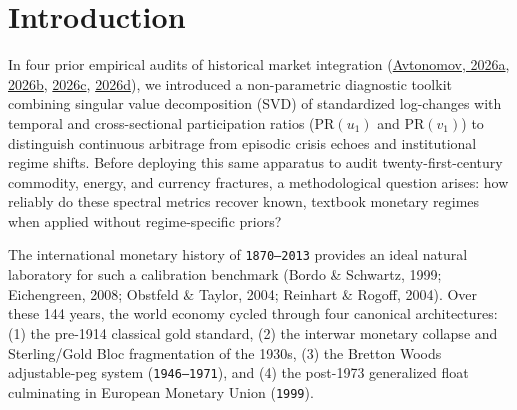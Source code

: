 \documentclass[11pt,a4paper]{article}
\begin{document}
\section{Introduction}

In four prior empirical audits of historical market integration (\href{https://doi.org}{Avtonomov, 2026a}, \href{https://doi.org}{2026b}, \href{https://doi.org}{2026c}, \href{https://doi.org}{2026d}), we introduced a non-parametric diagnostic toolkit combining singular value decomposition (SVD) of standardized log-changes with temporal and cross-sectional participation ratios ($\mathrm{PR}(u_1)$ and $\mathrm{PR}(v_1)$) to distinguish continuous arbitrage from episodic crisis echoes and institutional regime shifts. Before deploying this same apparatus to audit twenty-first-century commodity, energy, and currency fractures, a methodological question arises: how reliably do these spectral metrics recover known, textbook monetary regimes when applied without regime-specific priors?

The international monetary history of \texttt{1870--2013} provides an ideal natural laboratory for such a calibration benchmark (Bordo \& Schwartz, 1999; Eichengreen, 2008; Obstfeld \& Taylor, 2004; Reinhart \& Rogoff, 2004). Over these 144 years, the world economy cycled through four canonical architectures: (1) the pre-1914 classical gold standard, (2) the interwar monetary collapse and Sterling/Gold Bloc fragmentation of the 1930s, (3) the Bretton Woods adjustable-peg system (\texttt{1946--1971}), and (4) the post-1973 generalized float culminating in European Monetary Union (\texttt{1999}).
\end{document}
